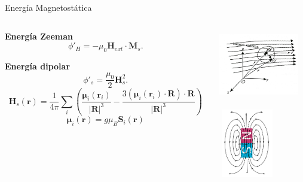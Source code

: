 \documentclass{beamer}
\begin{document}
\begin{frame}{Energía Magnetostática}
    \begin{columns}
    \begin{column}{0.5\textwidth}
           \textbf{Energía Zeeman}
           \[ \phi'_H = - \mu_0 \bm{H}_{ext} \cdot \bm{M}_s .\]

            \vspace{0.5cm}
           
           \textbf{Energía dipolar}
           \[ \phi'_s = \frac{\mu_0}{2} \bm{H}_s^2 .\]
           \[\bm{H}_s (\bm{r}) = \frac{1}{4 \pi}  \sum_i \left( \frac{\bm{\mu}_i (\bm{r}_i)}{|\bm{R}|^3} - \frac{3 (\bm{\mu}_i (\bm{r}_i) \cdot \bm{R} ) \cdot \bm{R} }{|\bm{R}|^3}  \right) \]
           \[ \bm{\mu}_i (\bm{r}) = g \mu_B \bm{S}_i (\bm{r}) \]
    \end{column}
    \begin{column}{0.5\textwidth}
            \centering
            \includegraphics[width=3.5cm,height=3cm]{pic/CampoExterno.jpg}

            \vspace{0.5cm}
            
            \hfill
            \includegraphics[width=2.5cm,height=3cm]{pic/DipoloMagnetico.png}
    \end{column}
    \end{columns}

\end{frame}
\end{document}
